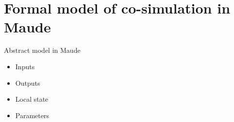 \section{Formal model of co-simulation in Maude}
Abstract model in Maude 
\begin{itemize}
  \item Inputs
  \item Outputs
  \item Local state
  \item Parameters
\end{itemize}

